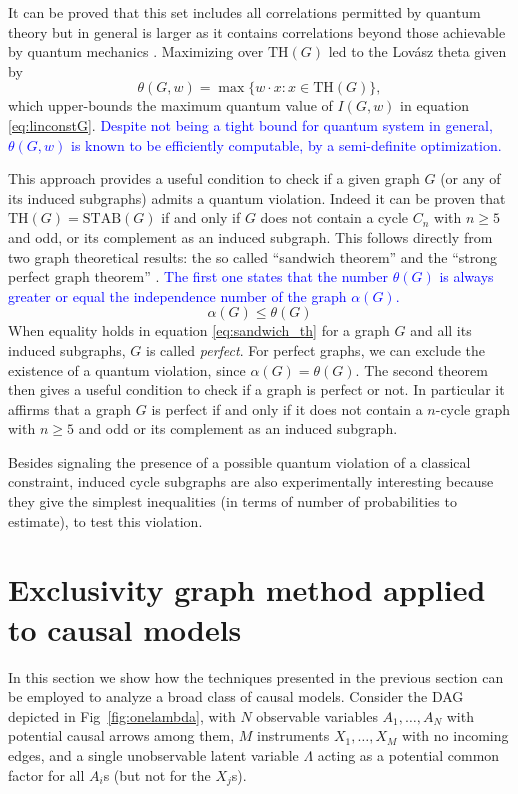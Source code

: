 \documentclass[letterpaper]{article}
\newcommand{\STAB}{\mathrm{STAB}}
\renewcommand{\TH}{\mathrm{TH}}
\begin{document}
It can be proved that this set includes all correlations permitted by quantum theory 
but in general is larger as it contains correlations beyond those achievable by quantum
mechanics \cite{almostquantum2015}.
Maximizing over $\TH(G)$ led to the Lovász theta given by
\begin{equation}
    \theta(G,w) = \max \{w\cdot x : x \in \TH(G)\},
    \label{eq:lovasztheta}
\end{equation}
which upper-bounds the maximum quantum value of $I(G,w)$ in equation \eqref{eq:linconstG}.
\textcolor{blue}{
Despite not being a tight bound for quantum system in general, $\theta(G,w)$ is known to be efficiently computable, by a semi-definite optimization.
}

This approach provides a useful condition to check if a given graph $G$
(or any of its induced subgraphs) admits a quantum violation. Indeed it can be
proven that $\TH(G) = \STAB(G)$ if and only if $G$ does not contain
a cycle $C_n$ with $n \ge 5$ and odd, or its complement as an induced
subgraph.
This follows directly from two graph theoretical results: the so called
``sandwich theorem''\cite{knuth,lovasz} and the ``strong perfect graph
theorem'' \cite{spgth}.
\textcolor{blue}{
The first one states that the number $\theta(G)$ is always greater or equal
the independence number of the graph $\alpha(G)$.}
\begin{equation}
    \alpha(G) \le \theta(G)
    \label{eq:sandwich_th}
\end{equation}
When equality holds in equation \eqref{eq:sandwich_th} for a graph $G$ and all its
induced subgraphs, $G$ is called \emph{perfect}.
For perfect graphs, we can exclude the existence of a quantum
violation, since $\alpha(G) = \theta(G)$.
The second theorem then gives a useful condition to check if a graph is perfect
or not. In particular it affirms that a graph $G$ is perfect if and only if it
does not contain a $n$-cycle graph with $n\ge5$ and odd or its complement as an
induced subgraph.

Besides signaling the presence of a possible quantum violation of a classical
constraint, induced cycle subgraphs are also experimentally interesting because
they give the simplest inequalities (in terms of number of probabilities to
estimate), to test this violation.

\section{Exclusivity graph method applied to causal models}
In this section we show how the techniques presented in the previous section can be employed to analyze
a broad class of causal models. Consider the DAG depicted in Fig~\ref{fig:onelambda}, with
$N$ observable variables $A_1, \ldots, A_N$ with potential causal arrows among them, $M$
instruments $X_1, \ldots, X_M$ with no incoming edges, and a single unobservable latent
variable $\Lambda$ acting as a potential common factor for all $A_i$s (but not for
the $X_j$s).
\end{document}
